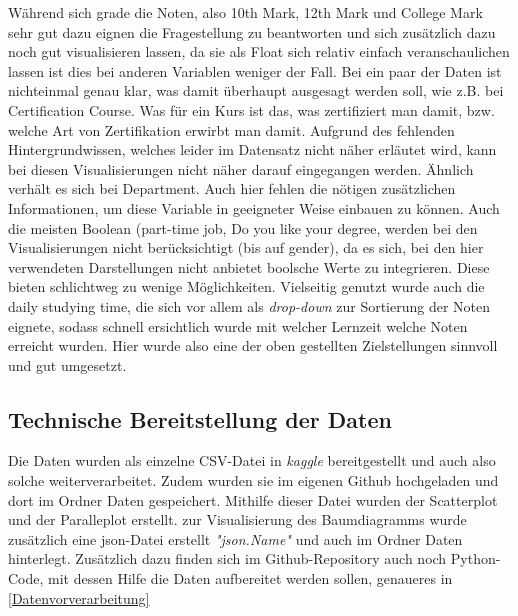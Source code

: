 \documentclass[usegeometry=true]{scrartcl}
\begin{document}
Während sich grade die Noten, also 10th Mark, 12th Mark und College Mark sehr gut dazu eignen die Fragestellung zu beantworten und sich zusätzlich dazu noch gut visualisieren lassen, da sie als Float sich relativ einfach veranschaulichen lassen ist dies bei anderen Variablen weniger der Fall. Bei ein paar der Daten ist nichteinmal genau klar, was damit überhaupt ausgesagt werden soll, wie z.B. bei Certification Course. Was für ein Kurs ist das,  was zertifiziert man damit, bzw. welche Art von Zertifikation erwirbt man damit. Aufgrund des fehlenden Hintergrundwissen, welches leider im Datensatz nicht näher erläutet wird, kann bei diesen Visualisierungen nicht näher darauf eingegangen werden. Ähnlich verhält es sich bei Department. Auch hier fehlen die nötigen zusätzlichen Informationen, um diese Variable in geeigneter Weise einbauen zu können.
Auch die meisten Boolean (part-time job, Do you like your degree,  werden bei den Visualisierungen nicht berücksichtigt (bis auf gender), da es sich, bei den hier verwendeten Darstellungen nicht anbietet boolsche Werte zu integrieren. Diese bieten schlichtweg zu wenige Möglichkeiten.
Vielseitig genutzt wurde auch die daily studying time, die sich vor allem als \textit{drop-down} zur Sortierung der Noten eignete, sodass schnell ersichtlich wurde mit welcher Lernzeit welche Noten erreicht wurden. 
Hier wurde also eine der oben gestellten Zielstellungen sinnvoll und gut umgesetzt.

\subsection{Technische Bereitstellung der Daten}
\label{Bereitstellung}

Die Daten wurden als einzelne CSV-Datei in \textit{kaggle} bereitgestellt und auch also solche weiterverarbeitet. 
Zudem wurden sie im eigenen Github hochgeladen und dort im Ordner Daten gespeichert. Mithilfe dieser Datei wurden der Scatterplot und der Paralleplot erstellt. zur Visualisierung des Baumdiagramms wurde zusätzlich eine json-Datei erstellt \textit{"json.Name"} und auch im Ordner Daten hinterlegt. Zusätzlich dazu finden sich im Github-Repository auch noch Python-Code, mit dessen Hilfe die Daten aufbereitet werden sollen, genaueres in \ref{Datenvorverarbeitung}
\end{document}
